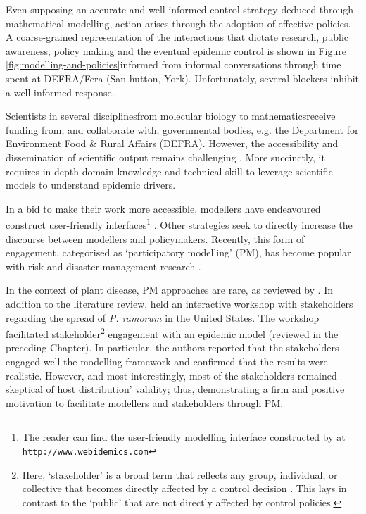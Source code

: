 Even supposing an accurate and well-informed control strategy deduced through mathematical modelling,
action arises through the adoption of effective policies. A coarse-grained representation
of the interactions that dictate research, public awareness, policy making and the eventual epidemic control
is shown in Figure \ref{fig:modelling-and-policies}\textemdash informed from informal conversations through time spent at DEFRA/Fera (San hutton, York).
Unfortunately, several blockers inhibit a well-informed response.

Scientists in several disciplines\textemdash from molecular biology to mathematics\textemdash receive funding from, and collaborate with, governmental bodies, 
e.g. the Department for Environment Food & Rural Affairs (DEFRA). However, the accessibility and dissemination of scientific output 
remains challenging \cite{jones2020modelling}. More succinctly, it requires in-depth domain knowledge and technical skill to leverage 
scientific models to understand epidemic drivers.

In a bid to make their work more accessible, modellers have endeavoured construct user-friendly interfaces\footnote{
The reader can find the user-friendly modelling interface constructed by \cite{WEBIDEMICS} at \nolinkurl{http://www.webidemics.com}} \cite{WEBIDEMICS}.
Other strategies seek to directly increase the discourse between modellers and policymakers.
Recently, this form of engagement, categorised as `participatory modelling' (PM), 
has become popular with risk and disaster management research \cite{hamalainen2020leadership, ravera2020participatory, hedelin2017participatory}.

In the context of plant disease, PM approaches are rare, as reviewed by \cite{gaydos2019forecasting}. In addition to 
the literature review, \cite{gaydos2019forecasting} held an interactive workshop with stakeholders regarding the 
spread of \textit{P. ramorum } in the United States. The workshop facilitated stakeholder\footnote{Here, `stakeholder' is a broad term that reflects any 
group, individual, or collective that becomes directly affected by a control decision \cite{reed2018theory}. This lays in contrast to the `public' 
that are not directly affected by control policies.}
engagement with an epidemic model \cite{tonini2017tangible} (reviewed in the preceding Chapter).
In particular, the authors reported that the stakeholders engaged well the modelling framework and
confirmed that the results were realistic. However, and most interestingly, most of the stakeholders
remained skeptical of host distribution' validity; thus, demonstrating a firm and positive motivation
to facilitate modellers and stakeholders through PM.





